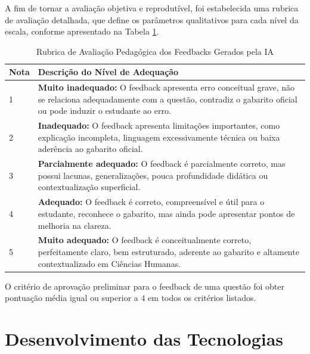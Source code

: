 \documentclass[
12pt,
openright,
oneside,
a4paper,
brazil
]{abntex2}
\begin{document}
A fim de tornar a avaliação objetiva e reprodutível, foi estabelecida uma rubrica de avaliação detalhada, que define os parâmetros qualitativos para cada nível da escala, conforme apresentado na Tabela \ref{tab:rubrica}.

\begin{table}[H]
    \centering
    \caption{Rubrica de Avaliação Pedagógica dos Feedbacks Gerados pela IA}
    \begin{tabular}{|p{}|p{}|}
        \hline
        \textbf{Nota} & \textbf{Descrição do Nível de Adequação} \\
        \hline
        1 & \textbf{Muito inadequado:} O feedback apresenta erro conceitual grave, não se relaciona adequadamente com a questão, contradiz o gabarito oficial ou pode induzir o estudante ao erro. \\
        \hline
        2 & \textbf{Inadequado:} O feedback apresenta limitações importantes, como explicação incompleta, linguagem excessivamente técnica ou baixa aderência ao gabarito oficial. \\
        \hline
        3 & \textbf{Parcialmente adequado:} O feedback é parcialmente correto, mas possui lacunas, generalizações, pouca profundidade didática ou contextualização superficial. \\
        \hline
        4 & \textbf{Adequado:} O feedback é correto, compreensível e útil para o estudante, reconhece o gabarito, mas ainda pode apresentar pontos de melhoria na clareza. \\
        \hline
        5 & \textbf{Muito adequado:} O feedback é conceitualmente correto, perfeitamente claro, bem estruturado, aderente ao gabarito e altamente contextualizado em Ciências Humanas. \\
        \hline
    \end{tabular}
    \label{tab:rubrica}
\end{table}

O critério de aprovação preliminar para o feedback de uma questão foi obter pontuação média igual ou superior a 4 em todos os critérios listados.


\chapter{Desenvolvimento das Tecnologias}
\end{document}
